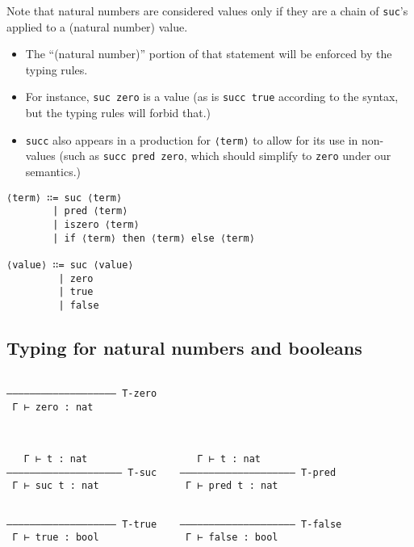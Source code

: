 \documentclass[11pt]{article}
\theoremstyle{definition}
\begin{document}
Note that natural numbers are considered values only if
they are a chain of \texttt{suc}'s applied to a (natural number) value.
\begin{itemize}
\item The “(natural number)” portion of that statement will be
enforced by the typing rules.
\item For instance, \texttt{suc zero} is a value
(as is \texttt{succ true} according to the syntax,
but the typing rules will forbid that.)
\item \texttt{succ} also appears in a production for \texttt{⟨term⟩} to allow for its use in non-values
(such as \texttt{succ pred zero}, which should simplify to \texttt{zero} under our semantics.)
\end{itemize}

\begin{verbatim}
⟨term⟩ ∷= suc ⟨term⟩
        | pred ⟨term⟩
        | iszero ⟨term⟩
        | if ⟨term⟩ then ⟨term⟩ else ⟨term⟩

⟨value⟩ ∷= suc ⟨value⟩
         | zero
         | true
         | false
\end{verbatim}

\subsection{Typing for natural numbers and booleans}
\label{sec:org1e48df6}

\begin{verbatim}
                               
––––––––––––––––––– T-zero     
 Γ ⊢ zero : nat
 
\end{verbatim}

\begin{verbatim}

   Γ ⊢ t : nat                   Γ ⊢ t : nat                 
–––––––––––––––––––– T-suc    –––––––––––––––––––– T-pred                                 
 Γ ⊢ suc t : nat               Γ ⊢ pred t : nat                                           

\end{verbatim}

\begin{verbatim}

––––––––––––––––––– T-true    –––––––––––––––––––– T-false
 Γ ⊢ true : bool               Γ ⊢ false : bool

\end{verbatim}
\end{document}
